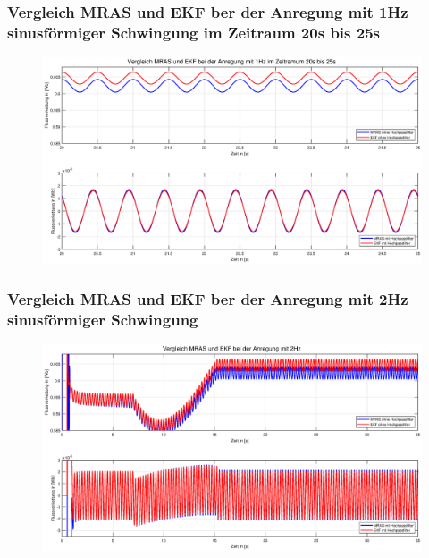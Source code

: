 \documentclass[serif,11pt, xcolor=table]{beamer}
\begin{document}
\begin{frame}
	\frametitle{Vergleich MRAS und EKF ber der Anregung mit 1Hz sinusförmiger Schwingung im Zeitraum 20s bis 25s }
	
	\begin{figure}[htbp]
		\centering
		\includegraphics[scale=0.30]{Abbildungen/Vergleich_1Hz_20s.eps}
		
	\end{figure}	
	
\end{frame}
\begin{frame}
	\frametitle{Vergleich MRAS und EKF ber der Anregung mit 2Hz sinusförmiger Schwingung }
	
	\begin{figure}[htbp]
		\centering
		\includegraphics[scale=0.30]{Abbildungen/Vergleich_2Hz.eps}
		
	\end{figure}	
	
\end{frame}
\end{document}
